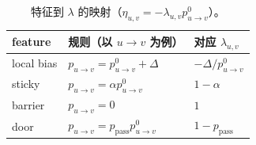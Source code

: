 \documentclass[11pt,fontset=fandol]{ctexart}
\begin{document}
\begin{table}[!htbp]
  \centering
  \begin{tabular}{lll}
    \toprule
    feature & 规则（以 $u\to v$ 为例） & 对应 $\lambda_{u,v}$\\
    \midrule
    local bias & $p_{u\to v}=p_{u\to v}^0+\Delta$ & $-\Delta/p_{u\to v}^0$\\
    sticky & $p_{u\to v}=\alpha p_{u\to v}^0$ & $1-\alpha$\\
    barrier & $p_{u\to v}=0$ & $1$\\
    door & $p_{u\to v}=p_{\text{pass}}p_{u\to v}^0$ & $1-p_{\text{pass}}$\\
    \bottomrule
  \end{tabular}
  \caption{特征到 $\lambda$ 的映射（$\eta_{u,v}=-\lambda_{u,v}p_{u\to v}^0$）。}
  \label{tab:lambda-map}
\end{table}
\end{document}
